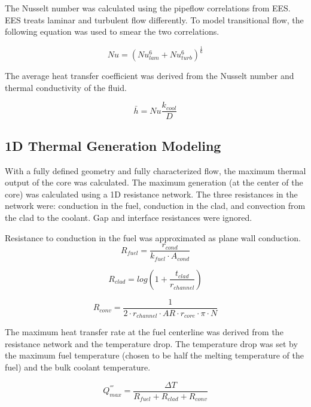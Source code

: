 The Nusselt number was calculated using the pipeflow correlations from EES. EES
treats laminar and turbulent flow differently. To model transitional flow, the
following equation was used to smear the two correlations.

\begin{equation}
    Nu = (Nu_{lam}^6 + Nu_{turb}^6)^{\frac{1}{6}}
\end{equation}

The average heat transfer coefficient was derived from the Nusselt number and
thermal conductivity of the fluid.

\begin{equation}
    \bar{h} = Nu \frac{k_{cool}}{D}
\end{equation}

\subsection{1D Thermal Generation Modeling}

With a fully defined geometry and fully characterized flow, the maximum thermal
output of the core was calculated. The maximum generation (at the center of the
core) was calculated using a 1D resistance network. The three resistances in the
network were: conduction in the fuel, conduction in the clad, and convection from
the clad to the coolant. Gap and interface resistances were ignored.

Resistance to conduction in the fuel was approximated as plane wall conduction.
\begin{equation}
    R_{fuel} =  \frac{r_{cond}}{k_{fuel}\cdot A_{cond}}
\end{equation}

\begin{equation}
    R_{clad} = log(1+\frac{t_{clad}}{r_{channel}})
\end{equation}

\begin{equation}
    R_{conv} = \frac{1}{2\cdot r_{channel}\cdot AR\cdot r_{core} \cdot \pi\cdot N}
\end{equation}

The maximum heat transfer rate at the fuel centerline was derived from the
resistance network and the temperature drop. The temperature drop was set
by the maximum fuel temperature (chosen to be half the melting temperature of
the fuel) and the bulk coolant temperature.

\begin{equation}
    Q^{'''}_{max} = \frac{\Delta T}{R_{fuel} + R_{clad} + R_{conv}}
\end{equation}

